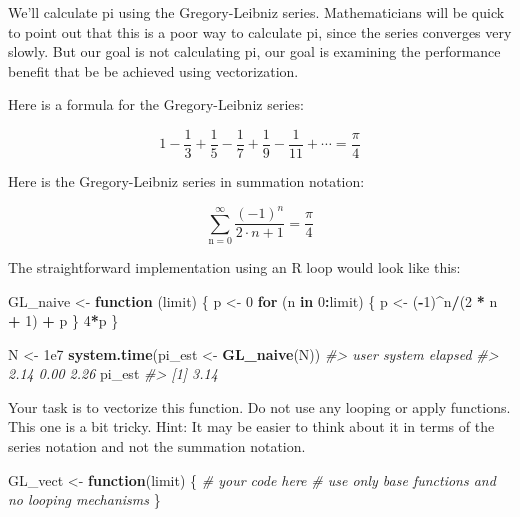 \documentclass[]{book}
\newenvironment{Shaded}{\begin{snugshade}}{\end{snugshade}}
\newcommand{\KeywordTok}[1]{\textcolor[rgb]{0.13,0.29,0.53}{\textbf{#1}}}
\newcommand{\DecValTok}[1]{\textcolor[rgb]{0.00,0.00,0.81}{#1}}
\newcommand{\FloatTok}[1]{\textcolor[rgb]{0.00,0.00,0.81}{#1}}
\newcommand{\StringTok}[1]{\textcolor[rgb]{0.31,0.60,0.02}{#1}}
\newcommand{\CommentTok}[1]{\textcolor[rgb]{0.56,0.35,0.01}{\textit{#1}}}
\newcommand{\ControlFlowTok}[1]{\textcolor[rgb]{0.13,0.29,0.53}{\textbf{#1}}}
\newcommand{\OperatorTok}[1]{\textcolor[rgb]{0.81,0.36,0.00}{\textbf{#1}}}
\newcommand{\NormalTok}[1]{#1}
\begin{document}
We'll calculate pi using the Gregory-Leibniz series. Mathematicians will
be quick to point out that this is a poor way to calculate pi, since the
series converges very slowly. But our goal is not calculating pi, our
goal is examining the performance benefit that be be achieved using
vectorization.

Here is a formula for the Gregory-Leibniz series:

\begin{equation}
1 - \frac{1}{3} + \frac{1}{5} - \frac{1}{7} + \frac{1}{9} - \frac{1}{11} + \cdots = \frac{\pi}{4}
\end{equation}

Here is the Gregory-Leibniz series in summation notation:

\begin{equation}
\sum_{\text{n}=0}^{\infty} \frac{(-1)^n}{2\cdot n + 1} = \frac{\pi}{4}
\end{equation}

The straightforward implementation using an R loop would look like this:

\begin{Shaded}
\begin{Highlighting}[]
\NormalTok{GL_naive <-}\StringTok{ }\ControlFlowTok{function}\NormalTok{ (limit) \{}
\NormalTok{  p <-}\StringTok{ }\DecValTok{0}
  \ControlFlowTok{for}\NormalTok{ (n }\ControlFlowTok{in} \DecValTok{0}\OperatorTok{:}\NormalTok{limit) \{}
\NormalTok{    p <-}\StringTok{ }\NormalTok{(}\OperatorTok{-}\DecValTok{1}\NormalTok{)}\OperatorTok{^}\NormalTok{n}\OperatorTok{/}\NormalTok{(}\DecValTok{2} \OperatorTok{*}\StringTok{ }\NormalTok{n }\OperatorTok{+}\StringTok{ }\DecValTok{1}\NormalTok{) }\OperatorTok{+}\StringTok{ }\NormalTok{p}
\NormalTok{    \}}
  \DecValTok{4}\OperatorTok{*}\NormalTok{p}
\NormalTok{\}}

\NormalTok{N <-}\StringTok{ }\FloatTok{1e7}
\KeywordTok{system.time}\NormalTok{(pi_est <-}\StringTok{ }\KeywordTok{GL_naive}\NormalTok{(N))}
\CommentTok{#>    user  system elapsed }
\CommentTok{#>    2.14    0.00    2.26}
\NormalTok{pi_est}
\CommentTok{#> [1] 3.14}
\end{Highlighting}
\end{Shaded}

Your task is to vectorize this function. Do not use any looping or apply
functions. This one is a bit tricky. Hint: It may be easier to think
about it in terms of the series notation and not the summation notation.

\begin{Shaded}
\begin{Highlighting}[]
\NormalTok{GL_vect <-}\StringTok{ }\ControlFlowTok{function}\NormalTok{(limit) \{}
  \CommentTok{# your code here}
  \CommentTok{# use only base functions and no looping mechanisms}
\NormalTok{\}}
\end{Highlighting}
\end{Shaded}
\end{document}
